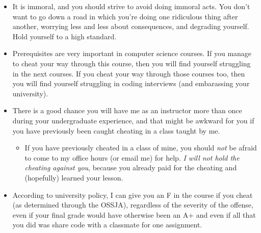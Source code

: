 \documentclass{article}
\begin{document}
\begin{itemize}[itemsep=0mm, parsep=0pt]
\item It is immoral, and you should strive to avoid doing immoral acts. You don't want to go down a road in which you're doing one ridiculous thing after another, worrying less and less about consequences, and degrading yourself. Hold yourself to a high standard.
\item Prerequisites are very important in computer science courses. If you manage to cheat your way through this course, then you will find yourself struggling in the next courses. If you cheat your way through those courses too, then you will find yourself struggling in coding interviews (and embarassing your university).
\item There is a good chance you will have me as an instructor more than once during your undergraduate experience, and that might be awkward for you if you have previously been caught cheating in a class taught by me.
    \begin{itemize}[itemsep=0mm, parsep=0pt]
    \item If you have previously cheated in a class of mine, you should \textit{not} be afraid to come to my office hours (or email me) for help. \textit{I will not hold the cheating against you}, because you already paid for the cheating and (hopefully) learned your lesson.
    \end{itemize}
\item According to university policy, I can give you an F in the course if you cheat (as determined through the OSSJA), regardless of the severity of the offense, even if your final grade would have otherwise been an A+ and even if all that you did was share code with a classmate for one assignment.
\end{itemize}
\end{document}
